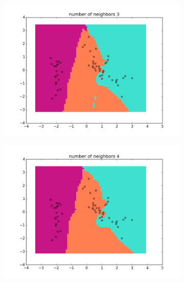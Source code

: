 \documentclass{article}
\begin{document}
\begin{center}
\begin{figure}
\centering  
        \begin{subfigure}[b]{0.48\textwidth}
                \centering
                \includegraphics[width=\linewidth]{figure_4}
        \end{subfigure}\hfill
        \begin{subfigure}[b]{0.48\textwidth}
                \centering
                \includegraphics[width=\linewidth]{figure_5}
        \end{subfigure}
        \label{fig:3}
\end{figure}


\end{center}
\end{document}
